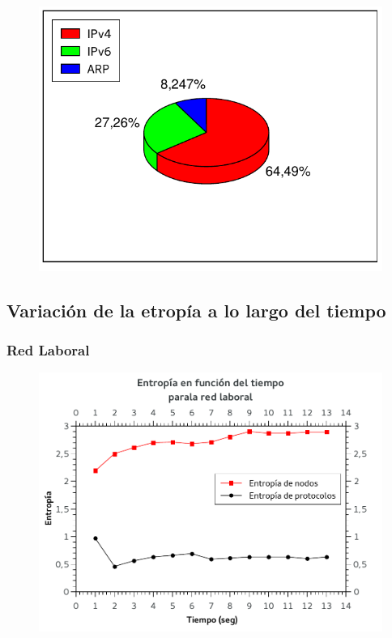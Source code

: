 \begin{figure}[h!]
  \begin{center}
    \includegraphics{graficos/protocolos-starbucks.pdf}
	\caption{}
    \label{fig:proto-starbucks}  
  \end{center}
\end{figure}


\FloatBarrier
\subsection{Variación de la etropía a lo largo del tiempo}


\FloatBarrier
\subsubsection{Red Laboral}

\begin{figure}[h!]
  \begin{center}
    \includegraphics{graficos/entropia-tiempo-bf.pdf}
	\caption{}
    \label{fig:proto-baufest}  
  \end{center}
\end{figure}

